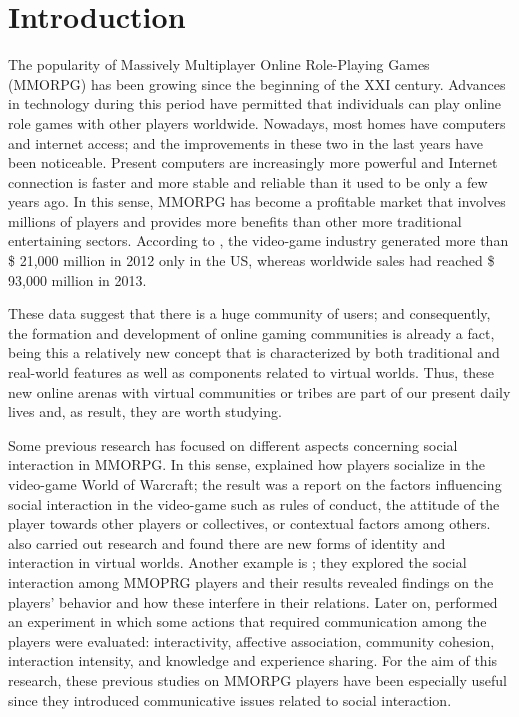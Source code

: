 \documentclass[english]{textolivre}
\begin{document}
\section{Introduction}\label{sec-intro}
The popularity of Massively Multiplayer Online Role-Playing Games (MMORPG) has been growing since the beginning of the XXI century. Advances in technology during this period have permitted that individuals can play online role games with other players worldwide. Nowadays, most homes have computers and internet access; and the improvements in these two in the last years have been noticeable. Present computers are increasingly more powerful and Internet connection is faster and more stable and reliable than it used to be only a few years ago. In this sense, MMORPG has become a profitable market that involves millions of players and provides more benefits than other more traditional entertaining sectors. According to \textcite{siwek2007}, the video-game industry generated more than \$ 21,000 million in 2012 only in the US, whereas worldwide sales had reached \$ 93,000 million in 2013. 

These data suggest that there is a huge community of users; and consequently, the formation and development of online gaming communities is already a fact, being this a relatively new concept that is characterized by both traditional and real-world features as well as components related to virtual worlds. Thus, these new online arenas with virtual communities or tribes are part of our present daily lives and, as result, they are worth studying. 

Some previous research has focused on different aspects concerning social interaction in MMORPG. In this sense, \textcite{chen2007} explained how players socialize in the video-game World of Warcraft; the result was a report on the factors influencing social interaction in the video-game such as rules of conduct, the attitude of the player towards other players or collectives, or contextual factors among others. \textcite{yee2006} also carried out research and found there are new forms of identity and interaction in virtual worlds. Another example is \textcite{cole2007}; they explored the social interaction among MMOPRG players and their results revealed findings on the players’ behavior and how these interfere in their relations. Later on, \textcite{mccreery2015} performed an experiment in which some actions that required communication among the players were evaluated: interactivity, affective association, community cohesion, interaction intensity, and knowledge and experience sharing. For the aim of this research, these previous studies on MMORPG players have been especially useful since they introduced communicative issues related to social interaction.
\end{document}
